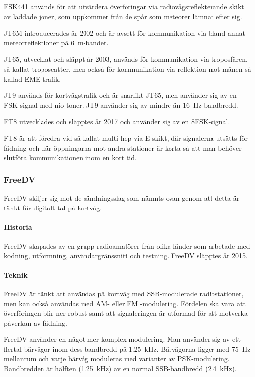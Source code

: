 FSK441 används för att utvärdera överföringar via radiovågsreflekterande skikt
av laddade joner, som uppkommer från de spår som meteorer lämnar efter sig.

JT6M introducerades år 2002 och är avsett för kommunikation via bland annat
meteorreflektioner på \SI{6}{\metre}-bandet.

JT65, utvecklat och släppt år 2003, används för kommunikation via troposfären,
så kallat troposcatter, men också för kommunikation via reflektion mot månen
så kallad EME-trafik.

JT9 används för kortvågstrafik och är snarlikt JT65, men använder sig av en
FSK-signal med nio toner.
JT9 använder sig av mindre än \SI{16}{\hertz} bandbredd.

FT8 utvecklades och släpptes år 2017 och använder sig av en 8FSK-signal.

FT8 är att föredra vid så kallat multi-hop via E-skikt, där signalerna utsätts för
fädning och där öppningarna mot andra stationer är korta så att man behöver
slutföra kommunikationen inom en kort tid.

\subsubsection{FreeDV}

FreeDV skiljer sig mot de sändningsslag som nämnts ovan genom att detta är tänkt
för digitalt tal på kortvåg.

\paragraph{Historia}

FreeDV skapades av en grupp radioamatörer från olika länder som arbetade
med kodning, utformning, användargränssnitt och testning.
FreeDV släpptes år 2015.

\paragraph{Teknik}

FreeDV är tänkt att användas på kortvåg med SSB-modulerade radiostationer,
men kan också användas med AM- eller FM -modulering.
Fördelen ska vara att överföringen blir ner robust samt att signaleringen är
utformad för att motverka påverkan av fädning.

FreeDV använder en något mer komplex modulering.
Man använder sig av ett flertal bärvågor inom dess bandbredd på
\SI{1,25}{\kilo\hertz}.
Bärvägorna ligger med \SI{75}{\hertz} mellanrum och varje bärvåg moduleras med
varianter av PSK-modulering.
Bandbredden är hälften (\SI{1,25}{\kilo\hertz}) av en normal SSB-bandbredd
(\SI{2,4}{\kilo\hertz}).

